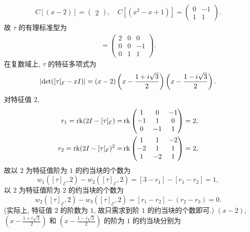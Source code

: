 \documentclass{assignment}
\begin{document}
\begin{sol}
\begin{itemize}
        \begin{align}
            C[(x-2)]=\begin{pmatrix}
                2
            \end{pmatrix},\quad C[(x^2-x+1)]=\begin{pmatrix}
                0&-1\\
                1&1
            \end{pmatrix}.
        \end{align}
        故 $\tau$ 的有理标准型为
        \begin{align}
            [\tau]=\begin{pmatrix}
                2&0&0\\
                0&0&-1\\
                0&1&1
            \end{pmatrix}.
        \end{align}
        在复数域上, $\tau$ 的特征多项式为
        \begin{align}
            \left\lvert\det([\tau]_{\mathcal{E}}-xI)\right\rvert=(x-2)\left(x-\frac{1+i\sqrt{3}}{2}\right)\left(x-\frac{1-i\sqrt{3}}{2}\right).
        \end{align}
        对特征值 $2$,
        \begin{align*}
            r_1=\operatorname{rk}(2I-[\tau]_{\mathcal{E}})=&\operatorname{rk}\begin{pmatrix}
                1&0&-1\\
                -1&1&0\\
                0&-1&1
            \end{pmatrix}=2,\\
            r_2=\operatorname{rk}(2I-[\tau]_{\mathcal{E}})^2=&\operatorname{rk}\begin{pmatrix}
                1&1&-2\\
                -2&1&1\\
                1&-2&1
            \end{pmatrix}=2,
        \end{align*}
        故以 $2$ 为特征值阶为 $1$ 的约当块的个数为
        \[
            w_1([\tau]_{\mathcal{E}},2)-w_2([\tau]_{\mathcal{E}},2)=[3-r_1]-[r_1-r_2]=1,
        \]
        以 $2$ 为特征值阶为 $2$ 的约当块的个数为
        \[
            w_2([\tau]_{\mathcal{E}},2)-w_3([\tau]_{\mathcal{E}},2)=[r_1-r_2]-(r_2-r_3)=0.
        \]
        (实际上, 特征值 $2$ 的阶数为 $1$, 故只需求到阶 $1$ 的约当块的个数即可.)
        $(x-2)$, $\left(x-\frac{1+i\sqrt{3}}{2}\right)$ 和 $\left(x-\frac{1-i\sqrt{3}}{2}\right)$ 的阶为 $1$ 的约当块分别为

\end{itemize}
\end{sol}
\end{document}
